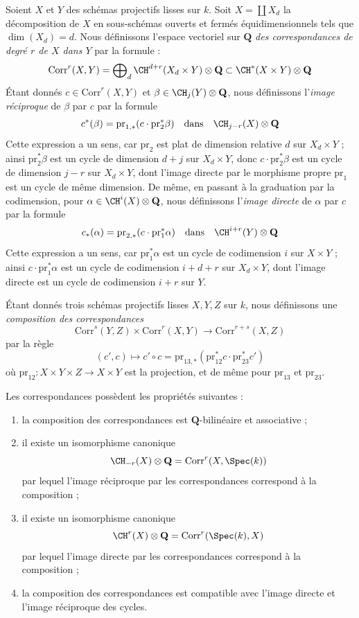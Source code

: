 \medskip\noindent
Soient $X$ et $Y$ des schémas projectifs lisses sur $k$.
Soit $X = \coprod X_d$ la décomposition de $X$ en
sous-schémas ouverts et fermés équidimensionnels
tels que $\dim(X_d) = d$. Nous définissons l'espace vectoriel sur $\mathbf{Q}$
{\it des correspondances de degré $r$ de $X$ dans $Y$}
par la formule :
$$
\text{Corr}^r(X, Y) =
\bigoplus\nolimits_d \CH^{d + r}(X_d \times Y) \otimes \mathbf{Q}
\subset
\CH^*(X \times Y) \otimes \mathbf{Q}
$$
Étant donnés $c \in \text{Corr}^r(X, Y)$ et $\beta \in \CH_j(Y) \otimes \mathbf{Q}$,
nous définissons l'{\it image réciproque} de $\beta$ par $c$ par la formule
$$
c^*(\beta) = \text{pr}_{1, *}(c \cdot \text{pr}_2^*\beta)
\quad\text{dans}\quad
\CH_{j - r}(X) \otimes \mathbf{Q}
$$
Cette expression a un sens, car $\text{pr}_2$ est plat de dimension relative
$d$ sur $X_d \times Y$ ; ainsi $\text{pr}_2^*\beta$ est un cycle de
dimension $d + j$ sur $X_d \times Y$, donc $c \cdot \text{pr}_2^*\beta$
est un cycle de dimension $j - r$ sur $X_d \times Y$, dont l'image directe
par le morphisme propre $\text{pr}_1$ est un cycle de même dimension.
De même, en passant à la graduation par la codimension,
pour $\alpha \in \CH^i(X) \otimes \mathbf{Q}$, nous définissons
l'{\it image directe} de $\alpha$ par $c$ par la formule
$$
c_*(\alpha) = \text{pr}_{2, *}(c \cdot \text{pr}_1^*\alpha)
\quad\text{dans}\quad
\CH^{i + r}(Y) \otimes \mathbf{Q}
$$
Cette expression a un sens, car $\text{pr}_1^*\alpha$ est un cycle de codimension
$i$ sur $X \times Y$ ; ainsi $c \cdot \text{pr}_1^*\alpha$ est un cycle
de codimension $i + d + r$ sur $X_d \times Y$, dont l'image directe
est un cycle de codimension $i + r$ sur $Y$.

\medskip\noindent
Étant donnés trois schémas projectifs lisses $X, Y, Z$ sur $k$, nous définissons une
{\it composition des correspondances}
$$
\text{Corr}^s(Y, Z)
\times
\text{Corr}^r(X, Y)
\longrightarrow
\text{Corr}^{r + s}(X, Z)
$$
par la règle
$$
(c', c)
\longmapsto
c' \circ c =
\text{pr}_{13, *}(\text{pr}_{12}^*c \cdot \text{pr}_{23}^*c')
$$
où $\text{pr}_{12} : X \times Y \times Z \to X \times Y$
est la projection, et de même pour $\text{pr}_{13}$ et $\text{pr}_{23}$.

\begin{lemma}
\label{lemma-composition-correspondences}
Les correspondances possèdent les propriétés suivantes :
\begin{enumerate}
\item la composition des correspondances est $\mathbf{Q}$-bilinéaire
et associative ;
\item il existe un isomorphisme canonique
$$
\CH_{-r}(X) \otimes \mathbf{Q} = \text{Corr}^r(X, \Spec(k))
$$
par lequel l'image réciproque par les correspondances correspond à la composition ;
\item il existe un isomorphisme canonique
$$
\CH^r(X) \otimes \mathbf{Q} = \text{Corr}^r(\Spec(k), X)
$$
par lequel l'image directe par les correspondances correspond à la composition ;
\item la composition des correspondances est compatible avec l'image directe
et l'image réciproque des cycles.
\end{enumerate}
\end{lemma}

